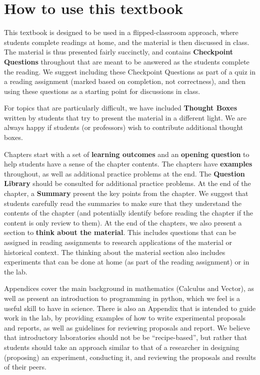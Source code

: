 \section*{How to use this textbook}
This textbook is designed to be used in a flipped-classroom approach, where students complete readings at home, and the material is then discussed in class. The material is thus presented fairly succinctly, and contains \textbf{Checkpoint Questions} throughout that are meant to be answered as the students complete the reading. We suggest including these Checkpoint Questions as part of a quiz in a reading assignment (marked based on completion, not correctness), and then using these questions as a starting point for discussions in class. 

For topics that are particularly difficult, we have included \textbf{Thought Boxes} written by students that try to present the material in a different light. We are always happy if students (or professors) wish to contribute additional thought boxes.

Chapters start with a set of \textbf{learning outcomes} and an \textbf{opening question} to help students have a sense of the chapter contents. The chapters have \textbf{examples} throughout, as well as additional practice problems at the end. The \textbf{Question Library} should be consulted for additional practice problems. At the end of the chapter, a \textbf{Summary} present the key points from the chapter. We suggest that students carefully read the summaries to make sure that they understand the contents of the chapter (and potentially identify before reading the chapter if the content is only review to them). At the end of the chapters, we also present a section to \textbf{think about the material}. This includes questions that can be assigned in reading assignments to research applications of the material or historical context. The thinking about the material section also includes experiments that can be done at home (as part of the reading assignment) or in the lab. 

Appendices cover the main background in mathematics (Calculus and Vector), as well as present an introduction to programming in python, which we feel is a useful skill to have in science. There is also an Appendix that is intended to guide work in the lab, by providing examples of how to write experimental proposals and reports, as well as guidelines for reviewing proposals and report. We believe that introductory laboratories should not be be ``recipe-based'', but rather that students should take an approach similar to that of a researcher in designing (proposing) an experiment, conducting it, and reviewing the proposals and results of their peers.

